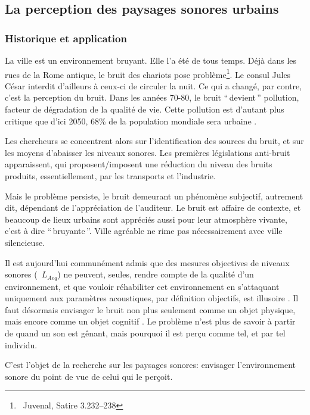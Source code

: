 \subsection{La perception des paysages sonores urbains}

\subsubsection{Historique et application}
\label{sec:ch3_urbanNoiseSoundscape}

La ville est un environnement bruyant. Elle l'a été de tous temps. Déjà dans les rues de la Rome antique, le bruit des chariots pose problème\footnote{\cf~Juvenal, Satire 3.232–238}. Le consul Jules César interdit d'ailleurs à ceux-ci de circuler la nuit. Ce qui a changé, par contre, c'est la perception du bruit. Dans les années 70-80, le bruit ``\,devient\,'' pollution, facteur de dégradation de la qualité de vie. Cette pollution est d'autant plus critique que d'ici 2050, 68\% de la population mondiale sera urbaine \citep{park14}.

Les chercheurs se concentrent alors sur l'identification des sources du bruit, et sur les moyens d'abaisser les niveaux sonores. Les premières législations anti-bruit apparaissent, qui proposent/imposent une réduction du niveau des bruits produits, essentiellement, par les transports et l'industrie.

Mais le problème persiste, le bruit demeurant un phénomène subjectif, autrement dit, dépendant de l'appréciation de l'auditeur. Le bruit est affaire de contexte, et beaucoup de lieux urbains sont appréciés aussi pour leur atmosphère vivante, c'est à dire ``\,bruyante\,''. Ville agréable ne rime pas nécessairement avec ville silencieuse.

Il est aujourd'hui communément admis que des mesures objectives de niveaux sonores (\eg~$L_{Aeq}$) ne peuvent, seules, rendre compte de la qualité d'un environnement, et que vouloir réhabiliter cet environnement en s'attaquant uniquement aux paramètres acoustiques, par définition objectifs, est illusoire \citep{yang2005acoustic,schulte2006soundscape,kang2010semantic,aletta2016soundscape}. Il faut désormais envisager le bruit non plus seulement comme un objet physique, mais encore comme un objet cognitif \citep{guastavino_etude_2003}. Le problème n'est plus de savoir à partir de quand un son est gênant, mais pourquoi il est perçu comme tel, et par tel individu.

C'est l'objet de la recherche sur les paysages sonores: envisager l'environnement sonore du point de vue de celui qui le perçoit.

